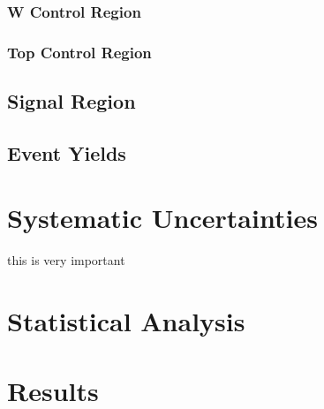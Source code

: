 \subsubsection{W Control Region}
\subsubsection{Top Control Region}
\subsection{Signal Region}
\subsection{Event Yields}

\section{Systematic Uncertainties}
this is very important

\section{Statistical Analysis}

\section{Results}
